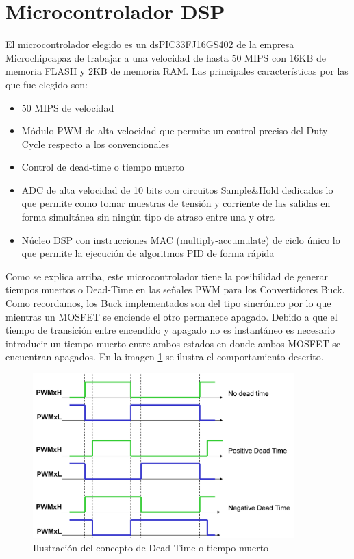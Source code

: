 \documentclass[12pt]{report}
\begin{document}
\section{Microcontrolador DSP}

El microcontrolador elegido es un dsPIC33FJ16GS402 de la empresa Microchip\textregistered capaz de trabajar a una velocidad de hasta 50 MIPS con 16KB de memoria FLASH y 2KB de memoria RAM. Las principales características por las que fue elegido son:

\begin{itemize}
	\item 50 MIPS de velocidad
	\item Módulo PWM de alta velocidad que permite un control preciso del Duty Cycle respecto a los convencionales
	\item Control de dead-time o tiempo muerto
	\item ADC de alta velocidad de 10 bits con circuitos Sample\&Hold dedicados lo que permite como tomar muestras de tensión y corriente de las salidas en forma simultánea sin ningún tipo de atraso entre una y otra
	\item Núcleo DSP con instrucciones MAC (multiply-accumulate) de ciclo único lo que permite la ejecución de algoritmos PID de forma rápida
\end{itemize} 

Como se explica arriba, este microcontrolador tiene la posibilidad de generar tiempos muertos o Dead-Time en las señales PWM para los Convertidores Buck. Como recordamos, los Buck implementados son del tipo sincrónico por lo que mientras un MOSFET se enciende el otro permanece apagado. Debido a que el tiempo de transición entre encendido y apagado no es instantáneo es necesario introducir un tiempo muerto entre ambos estados en donde ambos MOSFET se encuentran apagados. En la imagen \ref{deadtime} se ilustra el comportamiento descrito.

\begin{figure}[H]
	\centering
	\includegraphics[width=0.9\textwidth,height=\textheight,keepaspectratio]{deadtime}
	\caption{Ilustración del concepto de Dead-Time o tiempo muerto}
	\label{deadtime}
\end{figure}
\end{document}
